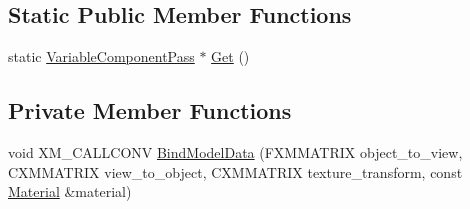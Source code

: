 \subsection*{Static Public Member Functions}
\begin{DoxyCompactItemize}
\item 
static \hyperlink{classmage_1_1_variable_component_pass}{Variable\+Component\+Pass} $\ast$ \hyperlink{classmage_1_1_variable_component_pass_a564365cd8383c82fe94ae017b29dcdd2}{Get} ()
\end{DoxyCompactItemize}
\subsection*{Private Member Functions}
\begin{DoxyCompactItemize}
\item 
void X\+M\+\_\+\+C\+A\+L\+L\+C\+O\+NV \hyperlink{classmage_1_1_variable_component_pass_abdd0f1d409317c650c7d70fe90ef29b1}{Bind\+Model\+Data} (F\+X\+M\+M\+A\+T\+R\+IX object\+\_\+to\+\_\+view, C\+X\+M\+M\+A\+T\+R\+IX view\+\_\+to\+\_\+object, C\+X\+M\+M\+A\+T\+R\+IX texture\+\_\+transform, const \hyperlink{classmage_1_1_material}{Material} \&material)
\end{DoxyCompactItemize}
